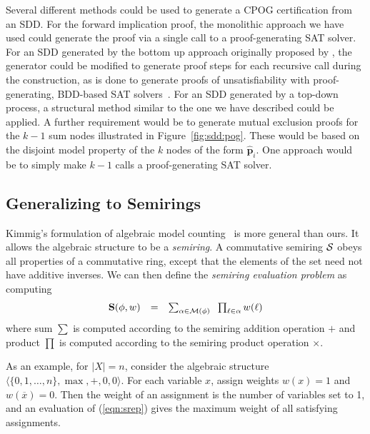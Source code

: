 \documentclass[twoside,11pt]{article}
\newcommand{\obar}[1]{\overline{#1}}
\newcommand{\lit}{\ell}
\newcommand{\semiring}{{\cal S}}
\newcommand{\srep}{\textbf{S}}
\newcommand{\radd}{+}
\newcommand{\rmul}{\times}
\newcommand{\modelset}{{\cal M}}
\newcommand{\makenode}[1]{\mathbf{#1}}
\newcommand{\nodep}{\makenode{p}}
\begin{document}
Several different methods could be used to generate a CPOG
certification from an SDD\@.  For the forward implication proof, the
monolithic approach we have used could generate the proof via a single
call to a proof-generating SAT solver.  For an SDD generated by the
bottom up approach originally proposed by ,
the generator could be modified to generate proof steps for each
recursive call during the construction, as is done to generate proofs
of unsatisfiability with proof-generating, BDD-based SAT
solvers~\cite{Jussila:2006,ebddres,bryant:fmcad:2022,bryant:tocl:2023}.
For an SDD generated by a top-down process, a structural method
similar to the one we have described could be applied.  A further
requirement would be to generate mutual exclusion proofs for the $k-1$
sum nodes illustrated in Figure~\ref{fig:sdd:pog}.  These would be
based on the disjoint model property of the $k$ nodes of the form
$\hat{\nodep}_i$.  One approach would be to simply make $k-1$ calls a
proof-generating SAT solver.

\subsection{Generalizing to Semirings}
\label{sect:semiring}

Kimmig's formulation of algebraic model
counting~\cite{kimmig:jal:2017} is more general than ours.  It allows
the algebraic structure to be a \emph{semiring}.  A commutative
semiring $\semiring$ obeys all properties of a commutative ring, except that the
elements of the set need not have additive inverses.
We can then define the {\em semiring evaluation problem} as computing
  \begin{equation}
    \begin{array}{rcl}
    \srep(\phi, w) & = & \sum_{\alpha \in \modelset(\phi)} \;\; \prod_{\lit \in \alpha} w(\ell) \label{eqn:srep}
    \end{array}
  \end{equation}
  where sum $\sum$ is computed according to the semiring addition operation $\radd$ and product $\prod$
  is computed according to the semiring product operation $\rmul$.

  As an example, for $|X| = n$, consider the algebraic structure
  $\langle \{0, 1, \ldots, n\}, \max, +, 0, 0 \rangle$.
For each variable $x$, assign weights
$w(x) = 1$ and $w(\obar{x}) = 0$.  Then the
weight of an assignment is the number of variables set to 1, and an
evaluation of (\ref{eqn:srep}) gives the maximum weight of all
satisfying assignments.
\end{document}
